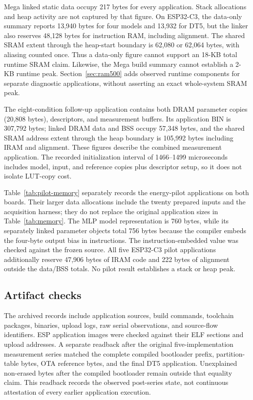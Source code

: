 \documentclass{ieeeaccess}
\begin{document}
Mega linked static data occupy 217 bytes for every application. Stack allocations and heap activity are not captured by that figure. On ESP32-C3, the data-only summary reports 13,940 bytes for four models and 13,932 for DT5, but the linker also reserves 48,128 bytes for instruction RAM, including alignment. The shared SRAM extent through the heap-start boundary is 62,080 or 62,064 bytes, with aliasing counted once. Thus a data-only figure cannot support an 18-KB total runtime SRAM claim. Likewise, the Mega build summary cannot establish a 2-KB runtime peak. Section~\ref{sec:ram500} adds observed runtime components for separate diagnostic applications, without asserting an exact whole-system SRAM peak.

The eight-condition follow-up application contains both DRAM parameter copies (20,808 bytes), descriptors, and measurement buffers. Its application BIN is 307,792 bytes; linked DRAM data and BSS occupy 57,348 bytes, and the shared SRAM address extent through the heap boundary is 105,992 bytes including IRAM and alignment. These figures describe the combined measurement application. The recorded initialization interval of 1466--1499 microseconds includes model, input, and reference copies plus descriptor setup, so it does not isolate LUT-copy cost.

Table~\ref{tab:pilot-memory} separately records the energy-pilot applications on both boards. Their larger data allocations include the twenty prepared inputs and the acquisition harness; they do not replace the original application sizes in Table~\ref{tab:memory}. The MLP model representation is 760 bytes, while its separately linked parameter objects total 756 bytes because the compiler embeds the four-byte output bias in instructions. The instruction-embedded value was checked against the frozen source. All five ESP32-C3 pilot applications additionally reserve 47,906 bytes of IRAM code and 222 bytes of alignment outside the data/BSS totals. No pilot result establishes a stack or heap peak.



\subsection{Artifact checks}
The archived records include application sources, build commands, toolchain packages, binaries, upload logs, raw serial observations, and source-flow identifiers. ESP application images were checked against their ELF sections and upload addresses. A separate readback after the original five-implementation measurement series matched the complete compiled bootloader prefix, partition-table bytes, OTA reference bytes, and the final DT5 application. Unexplained non-erased bytes after the compiled bootloader remain outside that equality claim. This readback records the observed post-series state, not continuous attestation of every earlier application execution.
\end{document}
